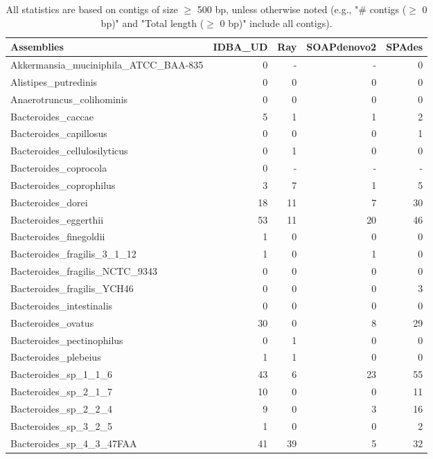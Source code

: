 \documentclass[12pt,a4paper]{article}
\begin{document}
\begin{table}[ht]
\begin{center}
\caption{All statistics are based on contigs of size $\geq$ 500 bp, unless otherwise noted (e.g., "\# contigs ($\geq$ 0 bp)" and "Total length ($\geq$ 0 bp)" include all contigs).}
\begin{tabular}{|l*{4}{|r}|}
\hline
Assemblies & IDBA\_UD & Ray & SOAPdenovo2 & SPAdes \\ \hline
Akkermansia\_muciniphila\_ATCC\_BAA-835 & 0 & - & - & 0 \\ \hline
Alistipes\_putredinis & 0 & 0 & 0 & 0 \\ \hline
Anaerotruncus\_colihominis & 0 & 0 & 0 & 0 \\ \hline
Bacteroides\_caccae & 5 & 1 & 1 & 2 \\ \hline
Bacteroides\_capillosus & 0 & 0 & 0 & 1 \\ \hline
Bacteroides\_cellulosilyticus & 0 & 1 & 0 & 0 \\ \hline
Bacteroides\_coprocola & 0 & - & - & - \\ \hline
Bacteroides\_coprophilus & 3 & 7 & 1 & 5 \\ \hline
Bacteroides\_dorei & 18 & 11 & 7 & 30 \\ \hline
Bacteroides\_eggerthii & 53 & 11 & 20 & 46 \\ \hline
Bacteroides\_finegoldii & 1 & 0 & 0 & 0 \\ \hline
Bacteroides\_fragilis\_3\_1\_12 & 1 & 0 & 1 & 0 \\ \hline
Bacteroides\_fragilis\_NCTC\_9343 & 0 & 0 & 0 & 0 \\ \hline
Bacteroides\_fragilis\_YCH46 & 0 & 0 & 0 & 3 \\ \hline
Bacteroides\_intestinalis & 0 & 0 & 0 & 0 \\ \hline
Bacteroides\_ovatus & 30 & 0 & 8 & 29 \\ \hline
Bacteroides\_pectinophilus & 0 & 1 & 0 & 0 \\ \hline
Bacteroides\_plebeius & 1 & 1 & 0 & 0 \\ \hline
Bacteroides\_sp\_1\_1\_6 & 43 & 6 & 23 & 55 \\ \hline
Bacteroides\_sp\_2\_1\_7 & 10 & 0 & 0 & 11 \\ \hline
Bacteroides\_sp\_2\_2\_4 & 9 & 0 & 3 & 16 \\ \hline
Bacteroides\_sp\_3\_2\_5 & 1 & 0 & 0 & 2 \\ \hline
Bacteroides\_sp\_4\_3\_47FAA & 41 & 39 & 5 & 32 \\ \hline

\end{tabular}
\end{center}
\end{table}
\end{document}
